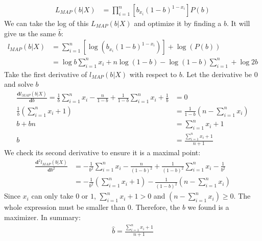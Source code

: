 \documentclass[twoside,11pt]{homework}
\begin{document}
\begin{equation*}
\begin{split}
L_{MAP}(b|X)  &= \prod_{i=1}^{n}[b_{x_i}(1-b)^{1-x_i}]P(b)
\end{split}
\end{equation*}
We can take the log of this  $L_{MAP}(b|X)$ and optimize it by finding a $b$. It will give us the same $\hat{b}$:
\begin{equation*}
\begin{split}
l_{MAP}(b|X)  &= \sum_{i=1}^{n}[\log(b_{x_i}(1-b)^{1-x_i})] + \log(P(b)) \\
							&= \log b \sum_{i=1}^{n} x_i + n\log (1-b) - \log (1-b) \sum_{i=1}^{n} + \log 2b
\end{split}
\end{equation*}
Take the first derivative of $l_{MAP}(b|X)$ with respect to $b$. Let the derivative be $0$ and solve $b$
\begin{equation*}
\begin{split}
\frac{\textbf{d} l_{MAP}(b|X)}{\textbf{d} b} = \frac{1}{b} \sum_{i=1}^{n} x_i  - \frac{n}{1-b} + \frac{1}{1-b}\sum_{i=1}^{n} x_i + \frac{1}{b} &= 0 \\
\frac{1}{b}(\sum_{i=1}^{n} x_i  + 1) & = \frac{1}{1-b}(n - \sum_{i=1}^{n} x_i) \\
b + bn &= \sum_{i=1}^{n} x_i  + 1 \\
b &= \frac{\sum_{i=1}^{n} x_i  + 1}{n+1}
\end{split}
\end{equation*}
We check its second derivative to ensure it is a maximal point: 
\begin{equation*}
\begin{split}
\frac{\textbf{d}^2 l_{MAP}(b|X)}{\textbf{d} b^2} &=  -\frac{1}{b^2}\sum_{i=1}^{n} x_i - \frac{n}{(1-b)^2} + \frac{1}{(1-b)^2}\sum_{i=1}^{n} x_i - \frac{1}{b^2}\\
&= -\frac{1}{b^2}(\sum_{i=1}^{n} x_i + 1) - \frac{1}{(1-b)^2}(n-\sum_{i=1}^{n} x_i)
\end{split}
\end{equation*}
Since $x_i$ can only take $0$ or $1$,  $\sum_{i=1}^{n} x_i + 1 > 0 $ and $(n-\sum_{i=1}^{n} x_i) \geq 0$. The whole expression must be smaller than 0. Therefore, the $b$ we found is a maximizer. In summary:
\begin{equation*}
\begin{split}
\hat{b} = \frac{\sum_{i=1}^{n} x_i  + 1}{n+1}
\end{split}
\end{equation*}
\end{document}
